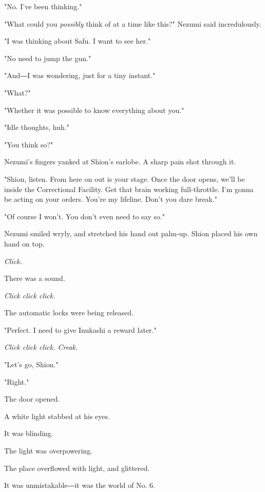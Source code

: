 "No. I've been thinking."

"What could you \emph{possibly} think of at a time like this?" Nezumi said
incredulously.

"I was thinking about Safu. I want to see her."

"No need to jump the gun."

"And―I was wondering, just for a tiny instant."

"What?"

"Whether it was possible to know everything about you."

"Idle thoughts, huh."

"You think so?"

Nezumi's fingers yanked at Shion's earlobe. A sharp pain shot through
it.

"Shion, listen. From here on out is your stage. Once the door opens,
we'll be inside the Correctional Facility. Get that brain working
full-throttle. I'm gonna be acting on your orders. You're my lifeline.
Don't you dare break."

"Of course I won't. You don't even need to say so."

Nezumi smiled wryly, and stretched his hand out palm-up. Shion placed
his own hand on top.

\emph{Click.}

There was a sound.

\emph{Click click click.}

The automatic locks were being released.

"Perfect. I need to give Inukashi a reward later."

\emph{Click click click. Creak.}

"Let's go, Shion."

"Right."

The door opened.

A white light stabbed at his eyes.

It was blinding.

The light was overpowering.

The place overflowed with light, and glittered.

It was unmistakable―it was the world of No. 6.